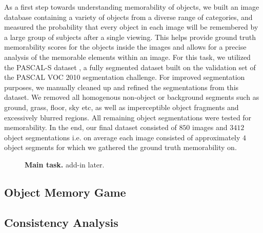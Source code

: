 As a first step towards understanding memorability of objects, we built an image database containing a variety of objects from a diverse range of categories, and measured the probability that every object in each image will be remembered by a large group of subjects after a single viewing. This helps provide ground truth memorability scores for the objects inside the images and allows for a precise analysis of the memorable elements within an image. For this task, we utilized the PASCAL-S dataset \cite{yin14}, a fully segmented dataset built on the validation set of the PASCAL VOC 2010 \cite{pascal10} segmentation challenge. For improved segmentation purposes, we manually cleaned up and refined the segmentations from this dataset. We removed all homogenous non-object or background segments such as ground, grass, floor, sky etc, as well as imperceptible object fragments and excessively blurred regions. All remaining object segmentations were tested for memorability. In the end, our final dataset consisted of $850$ images and $3412$ object segmentations i.e. on average each image consisted of approximately $4$ object segments for which we gathered the ground truth memorability on.

\begin{figure}[!htbp]
\centering
{}
\vspace{-5mm}\caption{\footnotesize\textbf{Main task.} add-in later. }\label{fig:mainTask}
\end{figure}

\subsection{Object Memory Game}


\subsection{Consistency Analysis}
 